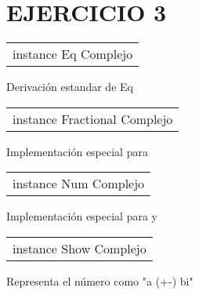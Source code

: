 \section{EJERCICIO 3}
\begin{haddockdesc}
\item[\begin{tabular}{@{}l}
instance Eq Complejo
\end{tabular}]
{\haddockbegindoc
Derivación estandar de Eq\par}
\end{haddockdesc}
\begin{haddockdesc}
\item[\begin{tabular}{@{}l}
instance Fractional Complejo
\end{tabular}]
{\haddockbegindoc
Implementación especial para \haddockid{(/)}\par}
\end{haddockdesc}
\begin{haddockdesc}
\item[\begin{tabular}{@{}l}
instance Num Complejo
\end{tabular}]
{\haddockbegindoc
Implementación especial para \haddockid{(+)} \haddockid{(-)} y \haddockid{(*)}\par}
\end{haddockdesc}
\begin{haddockdesc}
\item[\begin{tabular}{@{}l}
instance Show Complejo
\end{tabular}]
{\haddockbegindoc
Representa el número como "a (+-) bi"\par}
\end{haddockdesc}
